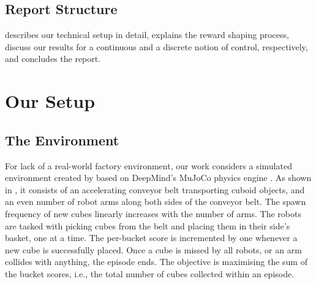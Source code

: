 \documentclass[conference,a4paper]{IEEEtran}
\begin{document}
\subsection{Report Structure}
 describes our technical setup in detail,  explains the reward shaping process,  discuss our results for a continuous and a discrete notion of control, respectively, and  concludes the report.


\section{Our Setup}
\label{sec:setup}


\subsection{The Environment}

For lack of a real-world factory environment, our work considers a simulated environment created by \citet{rostel_factory_2024} based on DeepMind's MuJoCo physics engine \citep{howell_predictive_2022}. As shown in , it consists of an accelerating conveyor belt transporting cuboid objects, and an even number of robot arms along both sides of the conveyor belt. The spawn frequency of new cubes linearly increases with the number of arms. The robots are tasked with picking cubes from the belt and placing them in their side's basket, one at a time. The per-bucket score is incremented by one whenever a new cube is successfully placed. Once a cube is missed by all robots, or an arm collides with anything, the episode ends. The objective is maximising the sum of the bucket scores, i.e., the total number of cubes collected within an episode.
\end{document}
